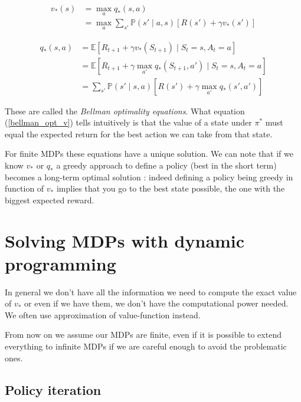 \documentclass[14pt,a4paper]{article}
\theoremstyle{definition}
\begin{document}
\begin{equation}
\begin{split}
v_{*}(s)&=\max_{a}q_{*}(s,a)
\\&=\max_{a} \sum_{s'}\mathbb{P}(s'\mid a,s)\left[R(s')+\gamma v_{*}(s')\right]
\end{split}
\label{bellman_opt_v}
\end{equation}

\begin{equation}
\begin{split}
q_{*}(s,a)&=\mathbb{E}\left[ R_{t+1} + \gamma v_{*}(S_ {t+1}) \mid S_t = s, A_t = a \right]
\\&=\mathbb{E}\left[ R_{t+1} + \gamma \max_{a'} q_{*}(S_{t+1},a') \mid S_t = s, A_t = a \right]
\\&= \sum_{s'}\mathbb{P}(s' \mid s,a)[R(s')+\gamma \max_{a'}q_{*}(s',a')]
\end{split}
\label{bellman_opt_q}
\end{equation}

These are called the \emph{Bellman optimality equations}. What equation (\ref{bellman_opt_v}) tells intuitively is that the value of a state under $\pi^*$ must equal the expected return for the best action we can take from that state.


For finite MDPs these equations have a unique solution. We can note that if we know $v_{*}$ or $q_{*}$ a greedy approach to define a policy (best in the short term) becomes a long-term optimal solution : indeed defining a policy being greedy in function of $v_*$ implies that you go to the best state possible, the one with the biggest expected reward.


\section{Solving MDPs with dynamic programming}

In general we don't have all the information we need to compute the exact value of $v_{*}$ or even if we have them, we don't have the computational 
power needed. We often use approximation of value-function instead.


From now on we assume our MDPs are finite, even if it is possible to extend everything to infinite MDPs if we are careful enough to avoid the problematic ones. \citep{Sutton}

\subsection{Policy iteration}
\end{document}
